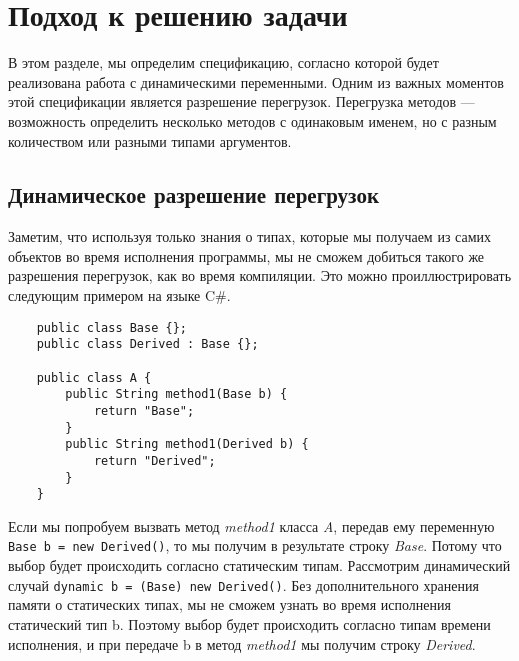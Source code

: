 \section{Подход к решению задачи}



В этом разделе, мы определим спецификацию, согласно которой будет реализована работа с динамическими переменными.  Одним из важных моментов этой спецификации является разрешение перегрузок. Перегрузка методов --- возможность определить несколько методов с одинаковым именем, но с разным количеством или разными типами аргументов.


\subsection{Динамическое разрешение перегрузок}

Заметим, что используя только знания о типах, которые мы получаем из самих объектов во время исполнения программы, мы не сможем добиться такого же разрешения перегрузок, как во время компиляции. Это можно проиллюстрировать следующим примером на языке C{\#}.

\begin{verbatim}
    public class Base {};
    public class Derived : Base {};
    
    public class A {
        public String method1(Base b) {
            return "Base";
        }
        public String method1(Derived b) {
            return "Derived";
        }
    }
\end{verbatim}

Если мы попробуем вызвать метод \textit{method1} класса \textit{A}, передав ему переменную  \texttt{Base b = new Derived()}, то мы получим в результате строку \textit{Base}. Потому что выбор будет происходить согласно статическим типам. Рассмотрим динамический случай \texttt{dynamic b = (Base) new Derived()}.
Без дополнительного хранения памяти о статических типах, мы не сможем узнать во время исполнения статический тип b. Поэтому выбор будет происходить согласно типам времени исполнения, и при передаче b в метод \textit{method1} мы получим строку \textit{Derived}.

